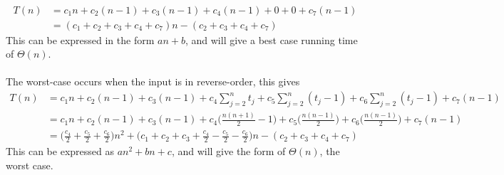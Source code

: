 \documentclass{article}
\begin{document}
\\
\begin{equation*}
\begin{split}
T(n) & = c_1n + c_2(n-1) + c_3(n-1) + c_4(n-1) + 0 + 0 + c_7(n-1) \\
  & = (c_1 + c_2 + c_3 + c_4 + c_7)n - (c_2 + c_3 + c_4 + c_7)
\end{split}
\end{equation*}
This can be expressed in the form $an + b$, and will give a best case running time of $\Theta(n)$.
\\
\\
The worst-case occurs when the input is in reverse-order, this gives
\begin{equation*}
\begin{split}
T(n) & = c_1n + c_2(n-1) + c_3(n-1) + c_4\sum_{j=2}^{n} t_j + c_5\sum_{j=2}^{n} (t_j-1) + c_6\sum_{j=2}^{n} (t_j-1) + c_7(n-1) \\
  & = c_1n + c_2(n-1) + c_3(n-1) + c_4\bigg(\frac{n(n+1)}{2} - 1 \bigg) + c_5\bigg(\frac{n(n-1)}{2}\bigg) + c_6\bigg(\frac{n(n-1)}{2}\bigg) + c_7(n-1) \\
  & = \bigg(\frac{c_4}{2} + \frac{c_5}{2} + \frac{c_6}{2}\bigg)n^2 + \bigg(c_1 + c_2 + c_3 + \frac{c_4}{2} - \frac{c_5}{2} - \frac{c_6}{2}\bigg)n - (c_2 + c_3 + c_4 + c_7)
\end{split}
\end{equation*}
This can be expressed as $an^2 + bn + c$, and will give the form of $\Theta(n)$, the worst case.
\\
\end{document}
